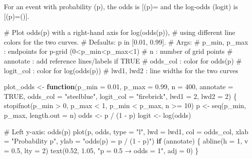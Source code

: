 \documentclass[
  letterpaper,
]{scrbook}
\newenvironment{Shaded}{\begin{snugshade}}{\end{snugshade}}
\newcommand{\AttributeTok}[1]{\textcolor[rgb]{0.40,0.45,0.13}{#1}}
\newcommand{\CommentTok}[1]{\textcolor[rgb]{0.37,0.37,0.37}{#1}}
\newcommand{\ConstantTok}[1]{\textcolor[rgb]{0.56,0.35,0.01}{#1}}
\newcommand{\ControlFlowTok}[1]{\textcolor[rgb]{0.00,0.23,0.31}{\textbf{#1}}}
\newcommand{\DecValTok}[1]{\textcolor[rgb]{0.68,0.00,0.00}{#1}}
\newcommand{\FloatTok}[1]{\textcolor[rgb]{0.68,0.00,0.00}{#1}}
\newcommand{\FunctionTok}[1]{\textcolor[rgb]{0.28,0.35,0.67}{#1}}
\newcommand{\NormalTok}[1]{\textcolor[rgb]{0.00,0.23,0.31}{#1}}
\newcommand{\OtherTok}[1]{\textcolor[rgb]{0.00,0.23,0.31}{#1}}
\newcommand{\SpecialCharTok}[1]{\textcolor[rgb]{0.37,0.37,0.37}{#1}}
\newcommand{\StringTok}[1]{\textcolor[rgb]{0.13,0.47,0.30}{#1}}
\begin{document}
For an event with probability (p), the odds is
{[}(p)=\frac{p}{1-p}{]} and the log-odds (logit) is
{[}(p)=\log\left(\right){]}.

\begin{Shaded}
\begin{Highlighting}[]
\CommentTok{\# Plot odds(p) with a right{-}hand axis for log(odds(p)),}
\CommentTok{\# using different line colors for the two curves.}
\CommentTok{\# Defaults: p in [0.01, 0.99].}
\CommentTok{\# Args:}
\CommentTok{\#   p\_min, p\_max : endpoints for p{-}grid (0\textless{}p\_min\textless{}p\_max\textless{}1)}
\CommentTok{\#   n            : number of grid points}
\CommentTok{\#   annotate     : add reference lines/labels if TRUE}
\CommentTok{\#   odds\_col     : color for odds(p)}
\CommentTok{\#   logit\_col    : color for log(odds(p))}
\CommentTok{\#   lwd1, lwd2   : line widths for the two curves}


\NormalTok{plot\_odds }\OtherTok{\textless{}{-}} \ControlFlowTok{function}\NormalTok{(}\AttributeTok{p\_min =} \FloatTok{0.01}\NormalTok{, }\AttributeTok{p\_max =} \FloatTok{0.99}\NormalTok{, }\AttributeTok{n =} \DecValTok{400}\NormalTok{,}
                      \AttributeTok{annotate =} \ConstantTok{TRUE}\NormalTok{,}
                      \AttributeTok{odds\_col =} \StringTok{"steelblue"}\NormalTok{,}
                      \AttributeTok{logit\_col =} \StringTok{"firebrick"}\NormalTok{,}
                      \AttributeTok{lwd1 =} \DecValTok{2}\NormalTok{, }\AttributeTok{lwd2 =} \DecValTok{2}\NormalTok{) \{}
  \FunctionTok{stopifnot}\NormalTok{(p\_min }\SpecialCharTok{\textgreater{}} \DecValTok{0}\NormalTok{, p\_max }\SpecialCharTok{\textless{}} \DecValTok{1}\NormalTok{, p\_min }\SpecialCharTok{\textless{}}\NormalTok{ p\_max, n }\SpecialCharTok{\textgreater{}=} \DecValTok{10}\NormalTok{)}
\NormalTok{  p }\OtherTok{\textless{}{-}} \FunctionTok{seq}\NormalTok{(p\_min, p\_max, }\AttributeTok{length.out =}\NormalTok{ n)}
\NormalTok{  odds }\OtherTok{\textless{}{-}}\NormalTok{ p }\SpecialCharTok{/}\NormalTok{ (}\DecValTok{1} \SpecialCharTok{{-}}\NormalTok{ p)}
\NormalTok{  logit }\OtherTok{\textless{}{-}} \FunctionTok{log}\NormalTok{(odds)}

  \CommentTok{\# Left y{-}axis: odds(p)}
  \FunctionTok{plot}\NormalTok{(p, odds, }\AttributeTok{type =} \StringTok{"l"}\NormalTok{, }\AttributeTok{lwd =}\NormalTok{ lwd1, }\AttributeTok{col =}\NormalTok{ odds\_col,}
       \AttributeTok{xlab =} \StringTok{"Probability p"}\NormalTok{,}
       \AttributeTok{ylab =} \StringTok{"odds(p) = p / (1 {-} p)"}\NormalTok{)}
  \ControlFlowTok{if}\NormalTok{ (annotate) \{}
    \FunctionTok{abline}\NormalTok{(}\AttributeTok{h =} \DecValTok{1}\NormalTok{, }\AttributeTok{v =} \FloatTok{0.5}\NormalTok{, }\AttributeTok{lty =} \DecValTok{2}\NormalTok{)}
    \FunctionTok{text}\NormalTok{(}\FloatTok{0.52}\NormalTok{, }\FloatTok{1.05}\NormalTok{, }\StringTok{"p = 0.5 → odds = 1"}\NormalTok{, }\AttributeTok{adj =} \DecValTok{0}\NormalTok{)}
\NormalTok{  \}}


\end{Highlighting}
\end{Shaded}
\end{document}
